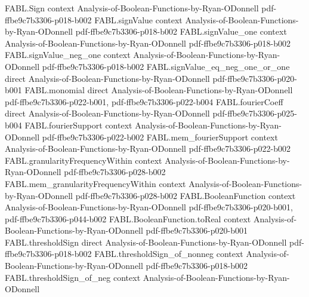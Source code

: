 \begin{theorem}
\label{FABL.totalInfluence_dictator}
\leanok
{}
\proofstep
  {FABL.Sign}
  {context}
  {Analysis-of-Boolean-Functions-by-Ryan-ODonnell}
  {pdf-ffbe9c7b3306-p018-b002}
\proofstep
  {FABL.signValue}
  {context}
  {Analysis-of-Boolean-Functions-by-Ryan-ODonnell}
  {pdf-ffbe9c7b3306-p018-b002}
\proofstep
  {FABL.signValue_one}
  {context}
  {Analysis-of-Boolean-Functions-by-Ryan-ODonnell}
  {pdf-ffbe9c7b3306-p018-b002}
\proofstep
  {FABL.signValue_neg_one}
  {context}
  {Analysis-of-Boolean-Functions-by-Ryan-ODonnell}
  {pdf-ffbe9c7b3306-p018-b002}
\proofstep
  {FABL.signValue_eq_neg_one_or_one}
  {direct}
  {Analysis-of-Boolean-Functions-by-Ryan-ODonnell}
  {pdf-ffbe9c7b3306-p020-b001}
\proofstep
  {FABL.monomial}
  {direct}
  {Analysis-of-Boolean-Functions-by-Ryan-ODonnell}
  {pdf-ffbe9c7b3306-p022-b001,
    pdf-ffbe9c7b3306-p022-b004}
\proofstep
  {FABL.fourierCoeff}
  {direct}
  {Analysis-of-Boolean-Functions-by-Ryan-ODonnell}
  {pdf-ffbe9c7b3306-p025-b004}
\proofstep
  {FABL.fourierSupport}
  {context}
  {Analysis-of-Boolean-Functions-by-Ryan-ODonnell}
  {pdf-ffbe9c7b3306-p022-b002}
\proofstep
  {FABL.mem_fourierSupport}
  {context}
  {Analysis-of-Boolean-Functions-by-Ryan-ODonnell}
  {pdf-ffbe9c7b3306-p022-b002}
\proofstep
  {FABL.granularityFrequencyWithin}
  {context}
  {Analysis-of-Boolean-Functions-by-Ryan-ODonnell}
  {pdf-ffbe9c7b3306-p028-b002}
\proofstep
  {FABL.mem_granularityFrequencyWithin}
  {context}
  {Analysis-of-Boolean-Functions-by-Ryan-ODonnell}
  {pdf-ffbe9c7b3306-p028-b002}
\proofstep
  {FABL.BooleanFunction}
  {context}
  {Analysis-of-Boolean-Functions-by-Ryan-ODonnell}
  {pdf-ffbe9c7b3306-p020-b001,
    pdf-ffbe9c7b3306-p044-b002}
\proofstep
  {FABL.BooleanFunction.toReal}
  {context}
  {Analysis-of-Boolean-Functions-by-Ryan-ODonnell}
  {pdf-ffbe9c7b3306-p020-b001}
\proofstep
  {FABL.thresholdSign}
  {direct}
  {Analysis-of-Boolean-Functions-by-Ryan-ODonnell}
  {pdf-ffbe9c7b3306-p018-b002}
\proofstep
  {FABL.thresholdSign_of_nonneg}
  {context}
  {Analysis-of-Boolean-Functions-by-Ryan-ODonnell}
  {pdf-ffbe9c7b3306-p018-b002}
\proofstep
  {FABL.thresholdSign_of_neg}
  {context}
  {Analysis-of-Boolean-Functions-by-Ryan-ODonnell}

\end{theorem}
